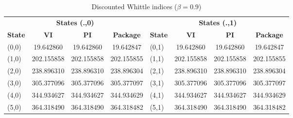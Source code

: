 \documentclass{article}
\begin{document}
\begin{table}[h!]
\centering
\caption{Discounted Whittle indices ($\beta=0.9$)}
\begin{tabular}{@{}lccc@{\hspace{2em}}lccc@{}}
\toprule
\multicolumn{4}{c}{\textbf{States (.,0)}} & \multicolumn{4}{c}{\textbf{States (.,1)}} \\
\cmidrule(lr){1-4} \cmidrule(lr){5-8}
\textbf{State} & \textbf{VI} & \textbf{PI} & \textbf{Package} & \textbf{State} & \textbf{VI} & \textbf{PI} & \textbf{Package} \\
\midrule
(0,0) & 19.642860 & 19.642860 & 19.642847 & (0,1) & 19.642860 & 19.642860 & 19.642847 \\
(1,0) & 202.155858 & 202.155858 & 202.155855 & (1,1) & 202.155858 & 202.155858 & 202.155855 \\
(2,0) & 238.896310 & 238.896310 & 238.896304 & (2,1) & 238.896310 & 238.896310 & 238.896304 \\
(3,0) & 305.377096 & 305.377096 & 305.377097 & (3,1) & 305.377096 & 305.377096 & 305.377097 \\
(4,0) & 344.934627 & 344.934627 & 344.934629 & (4,1) & 344.934627 & 344.934627 & 344.934629 \\
(5,0) & 364.318490 & 364.318490 & 364.318482 & (5,1) & 364.318490 & 364.318490 & 364.318482 \\
\bottomrule
\end{tabular}
\end{table}
\end{document}
